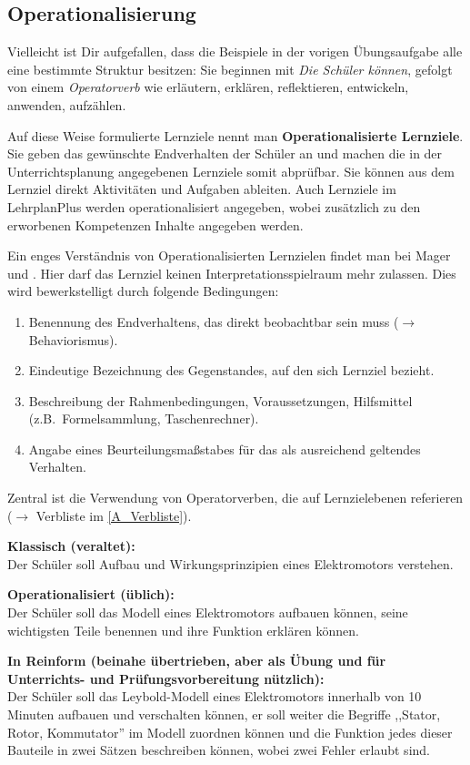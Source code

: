 \subsection{Operationalisierung}
Vielleicht ist Dir aufgefallen, dass die Beispiele in der vorigen Übungsaufgabe alle eine bestimmte Struktur besitzen: Sie beginnen mit \emph{Die Schüler können}, gefolgt von einem \emph{Operatorverb} wie erläutern, erklären, reflektieren, entwickeln, anwenden, aufzählen.

\mip
Auf diese Weise formulierte Lernziele nennt man \textbf{Operationalisierte Lernziele}. Sie geben das gewünschte Endverhalten der Schüler an und machen die in der Unterrichtsplanung angegebenen Lernziele somit abprüfbar. Sie können aus dem Lernziel direkt Aktivitäten und Aufgaben ableiten. Auch Lernziele im LehrplanPlus werden operationalisiert angegeben, wobei zusätzlich zu den erworbenen Kompetenzen Inhalte angegeben werden.

\mip
Ein enges Verständnis von Operationalisierten Lernzielen findet man bei Mager und \textcite{Gagne}. Hier darf das Lernziel keinen Interpretations\-spielraum mehr zulassen. Dies wird bewerkstelligt durch folgende Bedingungen:
\begin{enumerate}
	\item	Benennung des Endverhaltens, das direkt beobachtbar sein muss ($\to$ Behaviorismus).
	\item	Eindeutige Bezeichnung des Gegenstandes, auf den sich Lernziel bezieht.
	\item	Beschreibung der Rahmenbedingungen, Voraussetzungen, Hilfsmittel (z.B.\ Formelsammlung, Taschenrechner).
	\item	Angabe eines Beurteilungsma{\ss}stabes  f\"{u}r das als ausreichend 	geltendes Verhalten.
\end{enumerate} 
Zentral ist die Verwendung von Operatorverben, die auf Lernzielebenen referieren ($\to$ Verbliste im \cref{A_Verbliste}).

\begin{beisp}
	\textbf{Klassisch (veraltet):} \\ 
	Der Sch\"{u}ler soll Aufbau und Wirkungsprinzipien eines
	Elektromotors verstehen.
	
	\mip
	\textbf{Operationalisiert (üblich):} \\
	Der Sch\"{u}ler soll das Modell eines Elektromotors aufbauen k\"{o}nnen,
	seine wichtigsten Teile benennen und ihre Funktion erkl\"{a}ren k\"{o}nnen.
	
	\mip
	\textbf{In Reinform (beinahe übertrieben, aber als Übung und für Unterrichts- und Prüfungsvorbereitung nützlich):} \\
	Der Sch\"{u}ler soll das Leybold-Modell eines Elektromotors
		innerhalb von 10 Minuten aufbauen und verschalten k\"{o}nnen, er
		soll weiter die Begriffe ,,Stator, Rotor, Kommutator'' im
		Modell zuordnen k\"{o}nnen und die Funktion jedes dieser Bauteile
		in zwei S\"{a}tzen beschreiben k\"{o}nnen, wobei zwei Fehler erlaubt
		sind.
\end{beisp}

